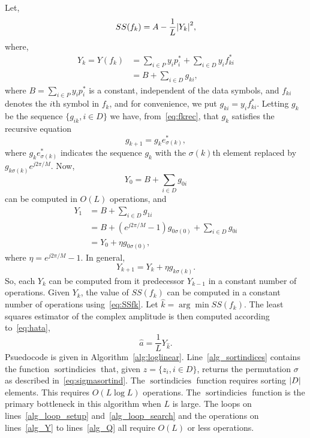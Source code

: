 \documentclass[journal]{IEEEtran}
\begin{document}
Let,
\begin{equation}\label{eq:SSfk}
SS(f_k) = A - \frac{1}{L}{\left\vert Y_k \right\vert}^2,
\end{equation}
where, 
\begin{align*}
Y_k = Y( f_k ) &= \sum_{i \in P} y_i p_i^*  + \sum_{i \in D} y_i f_{ki}^* \\
&= B + \sum_{i \in D}g_{ki},
\end{align*}
where $B = \sum_{i \in P} y_i p_i^*$ is a constant, independent of the data symbols, and $f_{ki}$ denotes the $i$th symbol in $f_k$, and for convenience, we put $g_{ki}  = y_i f_{ki}^*$.  Letting $g_{k}$ be the sequence $\{g_{ik}, i \in D\}$ we have, from~\eqref{eq:fkrec}, that $g_k$ satisfies the recursive equation
\[
g_{k+1} = g_{k} e_{\sigma(k)}^*,
\]
where $g_{k} e_{\sigma(k)}^*$ indicates the sequence $g_k$ with the $\sigma(k)$th element replaced by $g_{k \sigma(k)}e^{j2\pi/M}$.  Now,
\[
Y_0 = B + \sum_{i \in D} g_{0i}
\] 
can be computed in $O(L)$ operations, and
\begin{align*}
Y_1 &= B + \sum_{i \in D} g_{1i} \\
&= B +  (e^{j2\pi/M} - 1)g_{0\sigma(0)} + \sum_{i \in D} g_{0i} \\
&= Y_0 + \eta g_{0\sigma(0)},
\end{align*}
where $\eta = e^{j2\pi/M} - 1$.  In general,
\[
Y_{k+1} = Y_k + \eta g_{k\sigma(k)}.
\]
So, each $Y_k$ can be computed from it predecessor $Y_{k-1}$ in a constant number of operations.  Given $Y_k$, the value of $SS(f_k)$ can be computed in a constant number of operations using~\eqref{eq:SSfk}.  Let $\hat{k} = \arg\min SS(f_k)$.  The least squares estimator of the complex amplitude is then computed according to~\eqref{eq:hata},
\begin{equation}\label{eq:ahatYhat}
\hat{a} = \frac{1}{L} Y_{\hat{k}}.
\end{equation}
Psuedocode is given in Algorithm~\ref{alg:loglinear}.  Line~\ref{alg_sortindices} contains the function $\operatorname{sortindicies}$ that, given $z = \{z_i, i \in D\}$, returns the permutation $\sigma$ as described in~\eqref{eq:sigmasortind}.  The $\operatorname{sortindicies}$ function requires sorting ${\left\vert D \right\vert}$ elements.  This requires $O(L \log L)$ operations.  The $\operatorname{sortindicies}$ function is the primary bottleneck in this algorithm when $L$ is large.  The loops on lines~\ref{alg_loop_setup} and~\ref{alg_loop_search} and the operations on lines~\ref{alg_Y} to lines~\ref{alg_Q} all require $O(L)$ or less operations.  %
\end{document}
